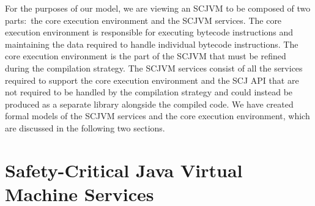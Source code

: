 \documentclass[a4paper,10pt]{report}
\begin{document}
For the purposes of our model, we are viewing an SCJVM to be composed
of two parts:~the core execution environment and the SCJVM services.
The core execution environment is responsible for executing bytecode
instructions and maintaining the data required to handle individual
bytecode instructions.
The core execution environment is the part of the SCJVM that must be
refined during the compilation strategy.
The SCJVM services consist of all the services required to support the
core execution environment and the SCJ API that are not required to be
handled by the compilation strategy and could instead be produced as a
separate library alongside the compiled code.
We have created formal models of the SCJVM services and the core
execution environment, which are discussed in the following two
sections.

\section{Safety-Critical Java Virtual Machine Services}

\end{document}
